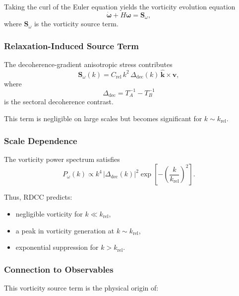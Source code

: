 \documentclass[11pt,a4paper]{article}
\begin{document}
Taking the curl of the Euler equation yields the vorticity evolution equation
\begin{equation}
\dot{\boldsymbol{\omega}}
+
H \boldsymbol{\omega}
=
\mathbf{S}_{\omega},
\end{equation}
where $\mathbf{S}_{\omega}$ is the vorticity source term.

\subsubsection{Relaxation-Induced Source Term}

The decoherence-gradient anisotropic stress contributes
\begin{equation}
\mathbf{S}_{\omega}(k)
=
C_{\mathrm{rel}}\,k^{2}\,
\Delta_{\mathrm{dec}}(k)\,
\hat{\mathbf{k}} \times \mathbf{v},
\end{equation}
where
\begin{equation}
\Delta_{\mathrm{dec}}
=
T_{A}^{-1}
-
T_{B}^{-1}
\end{equation}
is the sectoral decoherence contrast.

This term is negligible on large scales but becomes significant for
$k \sim k_{\mathrm{rel}}$.

\subsubsection{Scale Dependence}

The vorticity power spectrum satisfies
\begin{equation}
P_{\omega}(k)
\propto
k^{4}\,
|\Delta_{\mathrm{dec}}(k)|^{2}
\exp\!\left[
- \left(\frac{k}{k_{\mathrm{rel}}}\right)^{2}
\right].
\end{equation}

Thus, RDCC predicts:

\begin{itemize}
\item negligible vorticity for $k \ll k_{\mathrm{rel}}$,
\item a peak in vorticity generation at $k \sim k_{\mathrm{rel}}$,
\item exponential suppression for $k > k_{\mathrm{rel}}$.
\end{itemize}

\subsubsection{Connection to Observables}

This vorticity source term is the physical origin of:
\end{document}
